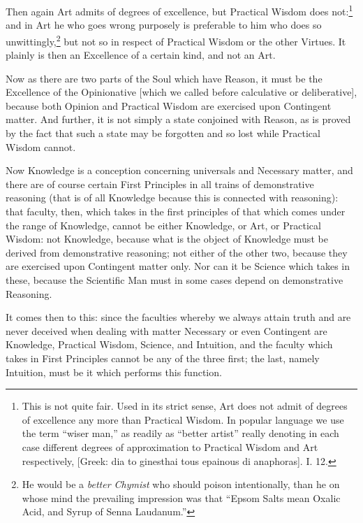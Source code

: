 Then again Art admits of degrees of excellence, but Practical Wisdom does
not:\footnote{This is not quite fair. Used in its strict sense, Art does not admit of degrees
of excellence any more than Practical Wisdom. In popular language we use the
term “wiser man,” as readily as “better artist” really
denoting in each case different degrees of approximation to Practical Wisdom
and Art respectively, [Greek: dia to ginesthai tous epainous di anaphoras]. I.
12.}
and in Art he who goes wrong purposely is preferable to him who does so
unwittingly,\footnote{He would be a \emph{better Chymist} who should poison intentionally, than he on
whose mind the prevailing impression was that “Epsom Salts mean Oxalic
Acid, and Syrup of Senna Laudanum.”}
but not so in respect of Practical Wisdom or the other Virtues. It plainly is
then an Excellence of a certain kind, and not an Art.

Now as there are two parts of the Soul which have Reason, it must be the
Excellence of the Opinionative [which we called before calculative or
deliberative], because both Opinion and Practical Wisdom are exercised upon
Contingent matter. And further, it is not simply a state conjoined with Reason,
as is proved by the fact that such a state may be forgotten and so lost while
Practical Wisdom cannot.


Now Knowledge is a conception concerning universals and Necessary matter, and
there are of course certain First Principles in all trains of demonstrative
reasoning (that is of all Knowledge because this is connected with reasoning):
that faculty, then, which takes in the first principles of that which comes
under the range of Knowledge, cannot be either Knowledge, or Art, or Practical
Wisdom: not Knowledge, because what is the object of Knowledge must be derived
from demonstrative reasoning; not either of the other two, because they are
exercised upon Contingent matter only. Nor can it be Science which takes in
these, because the Scientific Man must in some cases depend on demonstrative
Reasoning.

It comes then to this: since the faculties whereby we always attain truth and
are never deceived when dealing with matter Necessary or even Contingent are
Knowledge, Practical Wisdom, Science, and Intuition, and the faculty which
takes in First Principles cannot be any of the three first; the last, namely
Intuition, must be it which performs this function.


